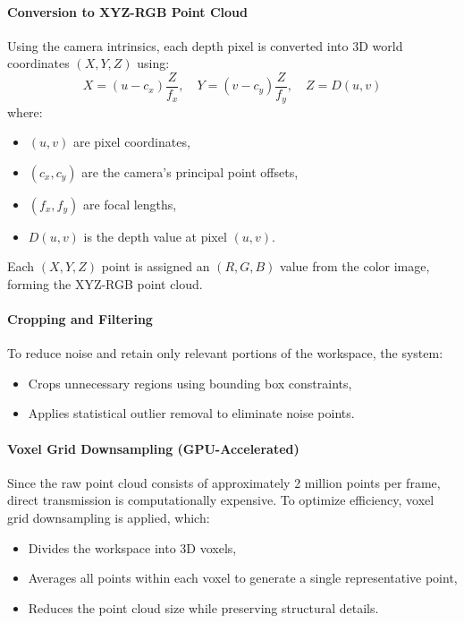 \paragraph{Conversion to XYZ-RGB Point Cloud}
Using the camera intrinsics, each depth pixel is converted into 3D world coordinates $(X, Y, Z)$ using:
\begin{equation}
    X = (u - c_x) \frac{Z}{f_x}, \quad Y = (v - c_y) \frac{Z}{f_y}, \quad Z = D(u,v)
\end{equation}
where:
\begin{itemize}
    \item $(u, v)$ are pixel coordinates,
    \item $(c_x, c_y)$ are the camera's principal point offsets,
    \item $(f_x, f_y)$ are focal lengths,
    \item $D(u,v)$ is the depth value at pixel $(u, v)$.
\end{itemize}
Each $(X, Y, Z)$ point is assigned an $(R, G, B)$ value from the color image, forming the XYZ-RGB point cloud.

\paragraph{Cropping and Filtering}
To reduce noise and retain only relevant portions of the workspace, the system:
\begin{itemize}
    \item Crops unnecessary regions using bounding box constraints,
    \item Applies statistical outlier removal to eliminate noise points.
\end{itemize}

\paragraph{Voxel Grid Downsampling (GPU-Accelerated)}
Since the raw point cloud consists of approximately 2 million points per frame, direct transmission is computationally expensive. To optimize efficiency, voxel grid downsampling is applied, which:
\begin{itemize}
    \item Divides the workspace into 3D voxels,
    \item Averages all points within each voxel to generate a single representative point,
    \item Reduces the point cloud size while preserving structural details.
\end{itemize}

